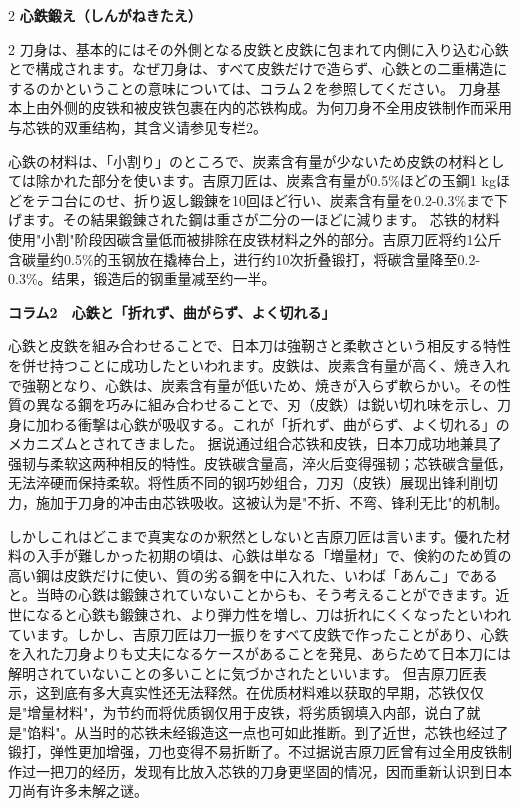 \documentclass[12pt,UTF8]{ctexbook}
\begin{document}
\begin{paracol}{2}
{\bfseries 心鉄鍛え（しんがねきたえ）}
\end{paracol}

\vspace{0.2em}

\begin{paracol}{2}
刀身は、基本的にはその外側となる皮鉄と皮鉄に包まれて内側に入り込む心鉄とで構成されます。なぜ刀身は、すべて皮鉄だけで造らず、心鉄との二重構造にするのかということの意味については、コラム２を参照してください。
\switchcolumn*
刀身基本上由外侧的皮铁和被皮铁包裹在内的芯铁构成。为何刀身不全用皮铁制作而采用与芯铁的双重结构，其含义请参见专栏2。
\switchcolumn*

心鉄の材料は、「小割り」のところで、炭素含有量が少ないため皮鉄の材料としては除かれた部分を使います。吉原刀匠は、炭素含有量が0.5\%ほどの玉鋼1 kgほどをテコ台にのせ、折り返し鍛錬を10回ほど行い、炭素含有量を0.2-0.3\%まで下げます。その結果鍛錬された鋼は重さが二分の一ほどに減ります。
\switchcolumn*
芯铁的材料使用"小割"阶段因碳含量低而被排除在皮铁材料之外的部分。吉原刀匠将约1公斤含碳量约0.5\%的玉钢放在撬棒台上，进行约10次折叠锻打，将碳含量降至0.2-0.3\%。结果，锻造后的钢重量减至约一半。
\switchcolumn*

{\bfseries コラム2　心鉄と「折れず、曲がらず、よく切れる」}
\switchcolumn*

心鉄と皮鉄を組み合わせることで、日本刀は強靭さと柔軟さという相反する特性を併せ持つことに成功したといわれます。皮鉄は、炭素含有量が高く、焼き入れで強靭となり、心鉄は、炭素含有量が低いため、焼きが入らず軟らかい。その性質の異なる鋼を巧みに組み合わせることで、刃（皮鉄）は鋭い切れ味を示し、刀身に加わる衝撃は心鉄が吸収する。これが「折れず、曲がらず、よく切れる」のメカニズムとされてきました。
\switchcolumn*
据说通过组合芯铁和皮铁，日本刀成功地兼具了强韧与柔软这两种相反的特性。皮铁碳含量高，淬火后变得强韧；芯铁碳含量低，无法淬硬而保持柔软。将性质不同的钢巧妙组合，刀刃（皮铁）展现出锋利削切力，施加于刀身的冲击由芯铁吸收。这被认为是"不折、不弯、锋利无比"的机制。
\switchcolumn*

しかしこれはどこまで真実なのか釈然としないと吉原刀匠は言います。優れた材料の入手が難しかった初期の頃は、心鉄は単なる「増量材」で、倹約のため質の高い鋼は皮鉄だけに使い、質の劣る鋼を中に入れた、いわば「あんこ」であると。当時の心鉄は鍛錬されていないことからも、そう考えることができます。近世になると心鉄も鍛錬され、より弾力性を増し、刀は折れにくくなったといわれています。しかし、吉原刀匠は刀一振りをすべて皮鉄で作ったことがあり、心鉄を入れた刀身よりも丈夫になるケースがあることを発見、あらためて日本刀には解明されていないことの多いことに気づかされたといいます。
\switchcolumn*
但吉原刀匠表示，这到底有多大真实性还无法释然。在优质材料难以获取的早期，芯铁仅仅是"增量材料"，为节约而将优质钢仅用于皮铁，将劣质钢填入内部，说白了就是"馅料"。从当时的芯铁未经锻造这一点也可如此推断。到了近世，芯铁也经过了锻打，弹性更加增强，刀也变得不易折断了。不过据说吉原刀匠曾有过全用皮铁制作过一把刀的经历，发现有比放入芯铁的刀身更坚固的情况，因而重新认识到日本刀尚有许多未解之谜。
\end{paracol}
\end{document}
